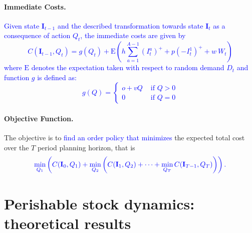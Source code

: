 \documentclass{tPRS2e}
\newcommand{\blue}{\textcolor{blue}}
\begin{document}
	
	\paragraph*{\bf Immediate Costs.}
\blue{Given state $\mathbf{I}_{t-1}$ and the described transformation  towards state $\mathbf{I}_{t}$ as a consequence of action $Q_t$, the immediate costs are given by
	\begin{equation}
		\label{eq:imcosts}
			C(\mathbf{I}_{t-1},Q_t) = g(Q_t)+ \mathrm E\left( h\sum_{a=1}^{A-1}(I^a_{t})^+ + p (-I^1_{t})^+ + w ~ W_t \right)
			\end{equation}
%	
where $\mathrm E$ denotes the expectation taken with respect to random demand $D_t$ and function $g$ is defined as:
%	
	\begin{equation}
	g(Q)=\left\{ 
	\begin{array}{ll}
	o + v Q & \text{ if } Q>0 \\
	0 & \text{ if } Q=0 
	\end{array}\right.
	\end{equation}
	}
	\paragraph*{\bf Objective Function.}
The objective is to \blue{find an order policy that minimizes} the expected total cost over the $T$ period planning horizon, that is
%	
	\begin{equation}
		\label{eq:recursive}
	\blue{	\min_{Q_1}\left( C(\mathbf{I}_0,Q_1)+\min_{Q_2}\left( C(\mathbf{I}_{1},Q_2)+ \cdots+\min_{Q_T}  C(\mathbf{I}_{T-1},Q_T)\right)\right).}
	\end{equation}
	
	
	

\section{Perishable stock dynamics: theoretical results}\label{sec:theoretical_results}
%	
\end{document}
